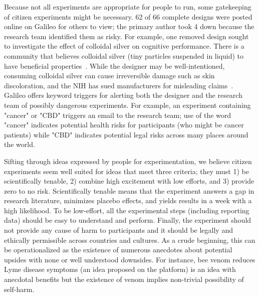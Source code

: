 Because not all experiments are appropriate for people to run, some gatekeeping of citizen experiments might be necessary. 62 of 66 complete designs were posted online on Galileo for others to view; the primary author took 4 down because the research team identified them as risky. For example, one removed design sought to investigate the effect of colloidal silver on cognitive performance. There is a community that believes colloidal silver (tiny particles suspended in liquid) to have beneficial properties~\cite{DanaLewis}. While the designer may be well-intentioned, consuming colloidal silver can cause irreversible damage such as skin discoloration, and the NIH has sued manufacturers for misleading claims~\cite{Health2018}. Galileo offers keyword triggers for alerting both the designer and the research team of possibly dangerous experiments. For example, an experiment containing "cancer" or "CBD" triggers an email to the research team; use of the word "cancer" indicates potential health risks for participants (who might be cancer patients) while "CBD" indicates potential legal risks across many places around the world.


Sifting through ideas expressed by people for experimentation, we believe citizen experiments seem well suited for ideas that meet three criteria; they must 1) be scientifically tenable, 2) combine high excitement with low efforts, and 3) provide zero to no risk. Scientifically tenable means that the experiment answers a gap in research literature, minimizes placebo effects, and yields results in a week with a high likelihood. To be low-effort, all the experimental steps (including reporting data) should be easy to understand and perform. Finally, the experiment should not provide any cause of harm to participants and it should be legally and ethically permissible across countries and cultures. As a crude beginning, this can be operationalized as the existence of numerous anecdotes about potential upsides with none or well understood downsides. For instance, bee venom reduces Lyme disease symptoms (an idea proposed on the platform) is an idea with anecdotal benefits but the existence of venom implies non-trivial possibility of self-harm.

